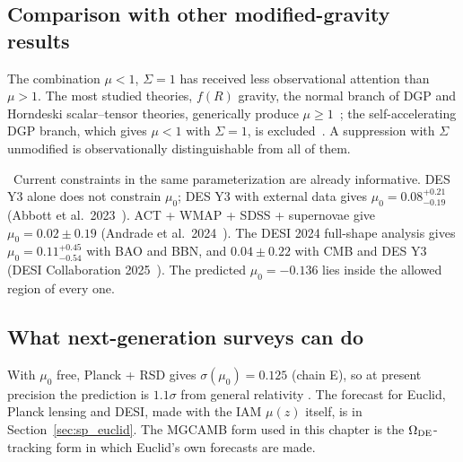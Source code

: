 \subsection{Comparison with other modified-gravity results}
The combination $\mu<1$, $\Sigma=1$ has received less observational attention than $\mu>1$. The most studied theories, $f(R)$ gravity, the normal
branch of DGP and Horndeski scalar--tensor theories, generically produce $\mu\ge1$~\cite{PogosianSilvestri2016}; the self-accelerating DGP branch,
which gives $\mu<1$ with $\Sigma=1$, is excluded~\cite{Koyama2007,Fang2008}. A suppression with $\Sigma$ unmodified is observationally distinguishable
from all of them.

\observed\ Current constraints in the same parameterization are already informative. DES Y3 alone does not constrain $\mu_0$; DES Y3 with external
data gives $\mu_0=0.08^{+0.21}_{-0.19}$ (Abbott et al.\ 2023~\cite{DESY3Ext}). ACT + WMAP + SDSS + supernovae give $\mu_0=0.02\pm0.19$ (Andrade et al.\
2024~\cite{Andrade2024}). The DESI 2024 full-shape analysis gives $\mu_0=0.11^{+0.45}_{-0.54}$ with BAO and BBN, and $0.04\pm0.22$ with CMB and DES Y3
(DESI Collaboration 2025~\cite{DESI2024VII}). The predicted $\mu_0=-0.136$ lies inside the allowed region of every one.

\subsection{What next-generation surveys can do}
With $\mu_0$ free, Planck + RSD gives $\sigma(\mu_0)=0.125$ (chain E), so at present precision the prediction is $1.1\sigma$ from general relativity
\calc. The forecast for Euclid, Planck lensing and DESI, made with the IAM $\mu(z)$ itself, is in Section~\ref{sec:sp_euclid}. The MGCAMB form
used in this chapter is the $\Omega_{\rm DE}$-tracking form in which Euclid's own forecasts are made.

